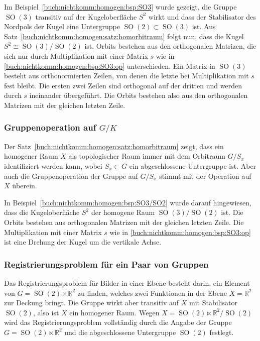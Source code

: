 \begin{beispiel}
\label{buch:nichtkomm:homogen:bsp:SO3/SO2}
Im Beispiel~\ref{buch:nichtkomm:homogen:bsp:SO3} wurde gezeigt,
die Gruppe $\operatorname{SO}(3)$ transitiv auf der Kugeloberfläche
$S^2$ wirkt und dass der Stabilisator des Nordpols der Kugel
eine Untergruppe $\operatorname{SO}(2)\subset\operatorname{SO}(3)$ ist.
Aus Satz~\ref{buch:nichtkomm:homogen:satz:homorbitraum} folgt nun,
dass die Kugel $S^2\cong \operatorname{SO}(3)/\operatorname{SO}(2)$
ist.
Orbits bestehen aus den orthogonalen Matrizen, die sich nur durch
Multiplikation mit einer Matrix $s$ wie in 
\eqref{buch:nichtkomm:homogen:bsp:SO3:op}
unterschieden.
Ein Matrix in $\operatorname{SO}(3)$ besteht aus orthonormierten 
Zeilen, von denen die letzte bei Multiplikation mit $s$ fest bleibt.
Die ersten zwei Zeilen sind orthogonal auf der dritten und werden durch
$s$ ineinander übergeführt.
Die Orbits bestehen also aus den orthogonalen Matrizen mit der gleichen
letzten Zeile.
\end{beispiel}

%
%
\subsubsection{Gruppenoperation auf $G/K$
\label{buch:nichtkomm:homogen:subsection:opaufgk}}
Der Satz~\ref{buch:nichtkomm:homogen:satz:homorbitraum} zeigt, dass
ein homogener Raum $X$ als topologischer Raum immer mit dem Orbitraum
$G/S_x$ identifiziert werden kann, wobei $S_x\subset G$ ein abgeschlossene
Untergruppe ist.
Aber auch die Gruppenoperation der Gruppe auf $G/S_x$ stimmt mit der
Operation auf $X$ überein.

\begin{beispiel}
In Beispiel~\ref{buch:nichtkomm:homogen:bsp:SO3/SO2} wurde darauf
hingewiesen, dass die Kugeloberfläche $S^2$ der homogene Raum
$\operatorname{SO}(3)/\operatorname{SO}(2)$ ist.
Die Orbits bestehen aus orthogonalen Matrizen mit der gleichen letzten
Zeile.
Die Multiplikation mit einer Matrix $s$ wie in 
\eqref{buch:nichtkomm:homogen:bsp:SO3:op}
ist eine Drehung der Kugel um die vertikale Achse.
\end{beispiel}

%
%
\subsubsection{Registrierungsproblem für ein Paar von Gruppen}
Das Registrierungsproblem für Bilder in einer Ebene besteht
darin, ein Element von $G=\operatorname{SO}(2)\ltimes \mathbb{R}^2$
zu finden, welches zwei Funktionen in der Ebene $X=\mathbb{R}^2$
zur Deckung bringt.
Die Gruppe wirkt aber transitiv auf $X$ mit Stabilisator
$\operatorname{SO}(2)$, also ist $X$ ein homogener Raum.
Wegen $X=\operatorname{SO}(2)\ltimes\mathbb{R}^2/\operatorname{SO}(2)$
wird das Registrierungsproblem vollständig durch die Angabe
der Gruppe $G=\operatorname{SO}(2)\ltimes \mathbb{R}^2$ und
die abgeschlossene Untergruppe $\operatorname{SO}(2)$ festlegt.

